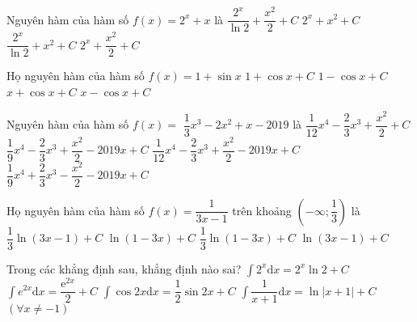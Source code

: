 \begin{ex}
	Nguyên hàm của hàm số $ f(x)=2^x+x$ là
	\choice
	{\True $\dfrac{2^x}{\ln 2}+\dfrac{x^2}{2}+C$}
	{$2^x+x^2+C$}
	{$\dfrac{2^x}{\ln 2}+x^2+C$}
	{$2^x+\dfrac{x^2}{2}+C$}
\end{ex}
\begin{ex}
	Họ nguyên hàm của hàm số $f(x)=1+\sin x$ 
	\choice
	{$ 1+\cos x+C$}
	{$ 1-\cos x+C$}
	{$ x+\cos x+C$}
	{\True $ x-\cos x+C$}
\end{ex}
\begin{ex}
	Nguyên hàm của hàm số $f(x)=$ $\dfrac{1}{3}{x^3}-2x^2+x-2019$ là
	\choice
	{$\dfrac{1}{12}{x^4}-\dfrac{2}{3}{x^3}+\dfrac{x^2}{2}+C$}
	{$\dfrac{1}{9}{x^4}-\dfrac{2}{3}{x^3}+\dfrac{x^2}{2}-2019x+C$}
	{\True $\dfrac{1}{12}{x^4}-\dfrac{2}{3}{x^3}+\dfrac{x^2}{2}-2019x+C$}
	{$\dfrac{1}{9}{x^4}+\dfrac{2}{3}{x^3}-\dfrac{x^2}{2}-2019x+C$}
\end{ex}
\begin{ex}
	Họ nguyên hàm của hàm số $ f(x)=\dfrac{1}{3x-1}$ trên khoảng $\left(-\infty ;\dfrac{1}{3}\right)$ là
	\choice
	{$\dfrac{1}{3}\ln (3x-1)+C$}
	{$\ln (1-3x)+C$}
	{\True $\dfrac{1}{3}\ln (1-3x)+C$}
	{$\ln (3x-1)+C$}
\end{ex}
\begin{ex}
	Trong các khẳng định sau, khẳng định nào sai?
	\choice
	{\True $\displaystyle\int{2^x\mathrm{d}x}=2^x\ln 2+C$}
	{$\displaystyle\int{{e}^{2x}\mathrm{d}x}=\dfrac{{\mathrm{e}}^{2x}}{2}+C$}
	{$\displaystyle\int{\cos 2x\mathrm{d}x}=\dfrac{1}{2}\sin 2x+C$}
	{$\displaystyle\int{\dfrac{1}{x+1}\mathrm{d}x}=\ln \left| x+1\right|+C$ $\left(\forall x\ne-1\right)$}
\end{ex}
